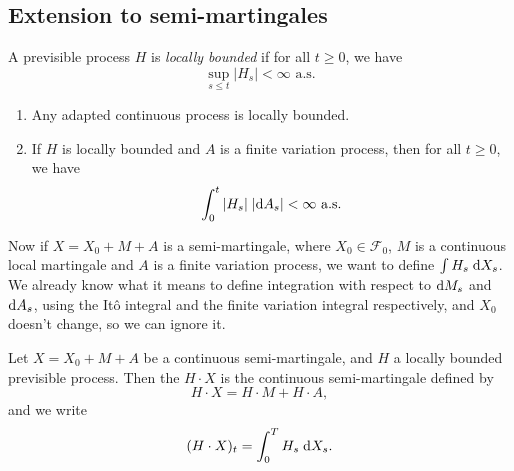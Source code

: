 \documentclass[a4paper]{article}
\begin{document}
\subsection{Extension to semi-martingales}
\begin{defi}
  A previsible process $H$ is \emph{locally bounded} if for all $t \geq 0$, we have
  \[
    \sup_{s \leq t}|H_s| < \infty\text{ a.s.}
  \]
\end{defi}

\begin{fact}\leavevmode
  \begin{enumerate}
    \item Any adapted continuous process is locally bounded.
    \item If $H$ is locally bounded and $A$ is a finite variation process, then for all $t \geq 0$, we have
      \[
        \int_0^t |H_s|\;|\mathrm{d} A_s| < \infty\text{ a.s.}
      \]
  \end{enumerate}
\end{fact}

Now if $X = X_0 + M + A$ is a semi-martingale, where $X_0 \in \mathcal{F}_0$, $M$ is a continuous local martingale and $A$ is a finite variation process, we want to define $\int H_s \;\mathrm{d} X_s$. We already know what it means to define integration with respect to $\mathrm{d} M_s$ and $\mathrm{d} A_s$, using the It\^o integral and the finite variation integral respectively, and $X_0$ doesn't change, so we can ignore it.

\begin{defi}
  Let $X = X_0 + M + A$ be a continuous semi-martingale, and $H$ a locally bounded previsible process. Then the  $H \cdot X$ is the continuous semi-martingale defined by
  \[
    H \cdot X = H \cdot M + H \cdot A,
  \]
  and we write
  \[
    (H \cdot X)_t = \int_0^T H_s \;\mathrm{d} X_s.
  \]
\end{defi}
\end{document}
